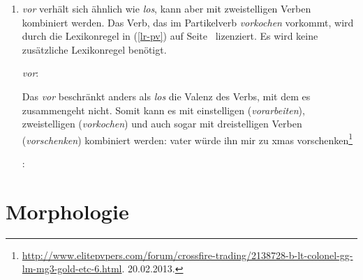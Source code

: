 \begin{enumerate}
\item \emph{vor} verhält sich ähnlich wie \emph{los}, kann aber mit zweistelligen Verben kombiniert
  werden. Das Verb, das im Partikelverb \emph{vorkochen} vorkommt, wird durch die Lexikonregel in
  (\ref{lr-pv}) auf Seite~\pageref{lr-pv} lizenziert. Es wird keine zusätzliche Lexikonregel benötigt.

\eas
\label{le-vor}
\mbox{\emph{vor}:}\\
\zs{}

Das \emph{vor} beschränkt anders als \emph{los} die Valenz des Verbs, mit dem es zusammengeht
nicht. Somit kann es mit einstelligen (\emph{vorarbeiten}), zweistelligen (\emph{vorkochen}) und
auch sogar mit dreistelligen Verben (\emph{vorschenken}) kombiniert werden:
\ea
vater würde ihn mir zu xmas vorschenken\footnote{
  \url{http://www.elitepvpers.com/forum/crossfire-trading/2138728-b-lt-colonel-gg-lm-mg3-gold-etc-6.html}. 20.02.2013.
}
\z

\eas
\label{le-kochen}
\mbox{:}\\
\zs

\end{enumerate}


\section{Morphologie}



